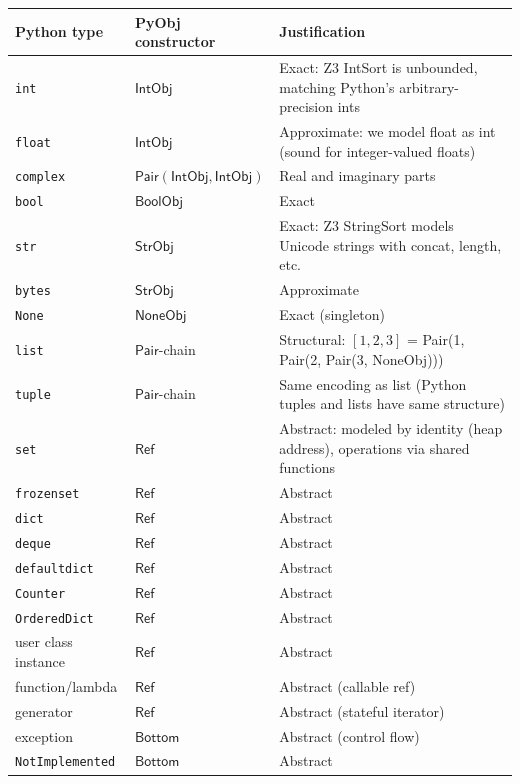 \documentclass[11pt,a4paper]{report}
\theoremstyle{definition}
\theoremstyle{plain}
\begin{document}
\begin{center}
\small
\begin{tabular}{l l l}
  \textbf{Python type} & \textbf{PyObj constructor} &
  \textbf{Justification} \\
  \hline
  \texttt{int} & $\mathsf{IntObj}$ & Exact: Z3 IntSort is
    unbounded, matching Python's arbitrary-precision ints \\
  \texttt{float} & $\mathsf{IntObj}$ & Approximate: we model
    float as int (sound for integer-valued floats) \\
  \texttt{complex} & $\mathsf{Pair}(\mathsf{IntObj},
    \mathsf{IntObj})$ & Real and imaginary parts \\
  \texttt{bool} & $\mathsf{BoolObj}$ & Exact \\
  \texttt{str} & $\mathsf{StrObj}$ & Exact: Z3 StringSort
    models Unicode strings with concat, length, etc. \\
  \texttt{bytes} & $\mathsf{StrObj}$ & Approximate \\
  \texttt{None} & $\mathsf{NoneObj}$ & Exact (singleton) \\
  \texttt{list} & $\mathsf{Pair}$-chain & Structural: $[1,2,3]$
    = Pair(1, Pair(2, Pair(3, NoneObj))) \\
  \texttt{tuple} & $\mathsf{Pair}$-chain & Same encoding as
    list (Python tuples and lists have same structure) \\
  \texttt{set} & $\mathsf{Ref}$ & Abstract: modeled by identity
    (heap address), operations via shared functions \\
  \texttt{frozenset} & $\mathsf{Ref}$ & Abstract \\
  \texttt{dict} & $\mathsf{Ref}$ & Abstract \\
  \texttt{deque} & $\mathsf{Ref}$ & Abstract \\
  \texttt{defaultdict} & $\mathsf{Ref}$ & Abstract \\
  \texttt{Counter} & $\mathsf{Ref}$ & Abstract \\
  \texttt{OrderedDict} & $\mathsf{Ref}$ & Abstract \\
  user class instance & $\mathsf{Ref}$ & Abstract \\
  function/lambda & $\mathsf{Ref}$ & Abstract (callable ref) \\
  generator & $\mathsf{Ref}$ & Abstract (stateful iterator) \\
  exception & $\mathsf{Bottom}$ & Abstract (control flow) \\
  \texttt{NotImplemented} & $\mathsf{Bottom}$ & Abstract \\
\end{tabular}
\end{center}
\end{document}
